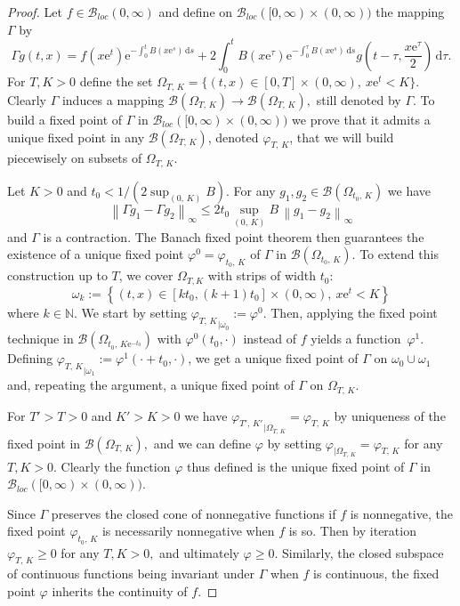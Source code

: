\documentclass[10pt]{amsart}
\theoremstyle{definition}\newtheorem{defi}[theo]{Definition}\newtheorem{rema}[theo]{Remark}\newtheorem{exam}[theo]{Example}\newtheorem{exem}[theo]{Example}\newtheorem{nota}[theo]{Notation}
\renewcommand{\leq}{\leqslant}
\renewcommand{\geq}{\geqslant}
\newcommand{\B}{\mathcal{B}}
\newcommand{\N}{\mathbb{N}}
\newcommand{\1}{\mathds{1}}
\newcommand{\e}{\mathrm{e}}
\renewcommand{\d}{\mathrm{d}}
\begin{document}

\begin{proof}
Let $f\in\B_{loc}(0,\infty)$ and define on $\B_{loc}([0,\infty)\times(0,\infty))$ the mapping $\Gamma$ by
\[
\Gamma g(t,x)=f\left(x\e^t\right)\e^{-\int_0^t B\left(x\e^s\right)\,\d s} + 2\int_0^t B\left(x\e^\tau\right)\e^{-\int_0^\tau B\left(x\e^s\right)\,\d s} g\left(t-\tau,\frac{x\e^\tau}{2}\right)\,\d\tau.
\]
For $T,K>0$ define the set $\Omega_{T,\,K}=\{(t,x)\in[0,T]\times(0,\infty),\ x\e^t<K\}.$ Clearly $\Gamma$ induces a mapping $\B(\Omega_{T,\,K})\to\B(\Omega_{T,\,K}),$ still denoted by $\Gamma.$ To build a fixed point of $\Gamma$ in $\B_{loc}([0,\infty)\times(0,\infty))$ we prove that it admits a unique fixed point in any $\B(\Omega_{T,\,K})$, denoted $\varphi_{T,\,K}$, that we will build piecewisely on subsets of $\Omega_{T,\,K}$.


Let $K>0$ and $t_0<1/(2\sup_{(0,\,K)}B).$ For any $g_1,g_2\in\B(\Omega_{t_0,\,K})$ we have
\[
\left\|\Gamma g_1-\Gamma g_2\right\|_\infty\leq2t_0 \sup_{(0,\,K)}\!B\,\left\|g_1-g_2\right\|_\infty
\]
and $\Gamma$ is a contraction. The Banach fixed point theorem then guarantees the existence of a unique fixed point $\varphi^0=\varphi_{t_0,\,K}$ of $\Gamma$ in $\B(\Omega_{t_0,\,K}).$ To extend this construction up to $T$, we cover $\Omega_{T,K}$ with strips of width $t_0$:
\[
\omega_k := \left\{(t,x)\in \left[kt_0,(k+1)t_0\right]\times (0,\infty),\ x\e^t < K\right\}
\]
where $k\in\N$. We start by setting ${\varphi_{T,\,K}}_{|\omega_0} := \varphi^0$. Then, applying the fixed point technique in $\B(\Omega_{t_0,\,K\e^{-t_0}})$ with $\varphi^0(t_0,\cdot)$ instead of $f$ yields a function~$\varphi^1$. Defining ${\varphi_{T,\,K}}_{|\omega_1} := \varphi^1(\cdot + t_0,\cdot)$, we get a unique fixed point of $\Gamma$ on $\omega_0 \cup \omega_1$ and, repeating the argument, a unique fixed point of $\Gamma$ on $\Omega_{T,\,K}$.


For $T'>T>0$ and $K'>K>0$ we have ${\varphi_{T',\,K'}}_{|\Omega_{T,\,K}}=\varphi_{T,\,K}$ by uniqueness of the fixed point in $\B(\Omega_{T,\,K}),$ and we can define $\varphi$ by setting $\varphi_{|\Omega_{T,\,K}}=\varphi_{T,\,K}$ for any $T,K>0.$ Clearly the function $\varphi$ thus defined is the unique fixed point of $\Gamma$ in $\B_{loc}([0,\infty)\times(0,\infty)).$


Since $\Gamma$ preserves the closed cone of nonnegative functions if $f$ is nonnegative, the fixed point $\varphi_{t_0,\,K}$ is necessarily nonnegative when $f$ is so. Then by iteration $\varphi_{T,\,K}\geq0$ for any $T,K>0,$ and ultimately $\varphi\geq0$. Similarly, the closed subspace of continuous functions being invariant under $\Gamma$ when $f$ is continuous, the fixed point $\varphi$ inherits the continuity of $f$.


\end{proof}
\end{document}
